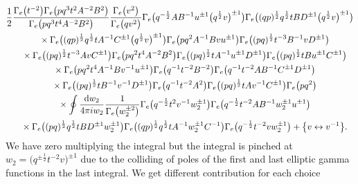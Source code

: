 \documentclass[a4paper,12pt]{article}
\begin{document}
\begin{gather*}
\frac12\frac{\Gamma_e\big(t^{-2}\big)\Gamma_e\big(pq^3t^2A^{-2}B^2\big)}
{\Gamma_e\big(pq^3 t^4 A^{-2}B^2\big)}\frac{\Gamma_e\big(v^2\big)}{\Gamma_e\big(qv^2\big)}
\Gamma_e\big( q^{-\frac12}AB^{-1}u^{\pm1}\big(q^\frac12 v\big)^{\pm1}\big)\Gamma_e\big((qp)^{\frac12}q^\frac12 t B D^{\pm1}\big(q^\frac12 v\big)^{\pm1}\big)\\
\quad{} \times\Gamma_e\big( ( q p)^{\frac12} q^\frac12 t A^{-1} C^{\pm1} \big(q^\frac12 v\big)^{\pm1}\big) \Gamma_e\big(pq^2A^{-1}Bvu^{\pm1}\big)\Gamma_e\big((pq)^\frac12 t^{-3}B^{-1}vD^{\pm1}\big)\\
\quad{} \times\Gamma_e\big((pq)^\frac12 t^{-3}AvC^{\pm1}\big)\Gamma_e\big(pq^2t^4A^{-2}B^2\big)\Gamma_e\big((pq)^\frac12 t A^{-1}u^{\pm1}D^{\pm1}\big)\Gamma_e\big((pq)^\frac12 tBu^{\pm1}C^{\pm1}\big)\\
\quad{} \times\Gamma_e\big(pq^2t^4A^{-1}B v^{-1}u^{\pm1}\big)\Gamma_e\big(q^{-1}t^{-2}B^{-2}\big)\Gamma_e\big(q^{-1}t^{-2}AB^{-1}C^{\pm1}D^{\pm1}\big)\\
\quad{}\times\Gamma_e\big((pq)^\frac12 t B^{-1}v^{-1}D^{\pm1}\big) \Gamma_e\big(q^{-1}t^{-2}A^2\big)\Gamma_e\big((pq)^\frac12 t Av^{-1}C^{\pm1}\big)\Gamma_e\big(pq^2\big)\\
\quad{}\times \oint \frac{{\rm d}w_2}{4\pi i w_2} \frac{1}{\Gamma_e\big(w_2^{\pm2}\big)} \Gamma_e\big(q^{-\frac12}t^2 v^{-1} w_2^{\pm1}\big) \Gamma_e\big(q^{-\frac12} t^{-2} A B^{-1} w_2^{\pm1} u^{\pm1}\big)\\
\quad{} \times\Gamma_e \big((pq)^{\frac12}q^\frac12 t B D^{\pm1}w_2^{\pm1}\big)
\Gamma_e\big( ( q p )^{\frac12}q^\frac12 t A^{-1} w_2^{\pm1} C^{-1}\big) \Gamma_e\big( q^{-\frac12}t^{-2} v w_2^{\pm1} \big)
+\big\{v \leftrightarrow v^{-1} \big\} .
\end{gather*}
We have zero multiplying the integral but the integral is pinched at $w_2=\big(q^{\pm\frac12}t^{-2}v\big)^{\pm1}$ due to the colliding of poles of the first and last elliptic gamma functions in the last integral. We get different contribution for each choice
\end{document}
